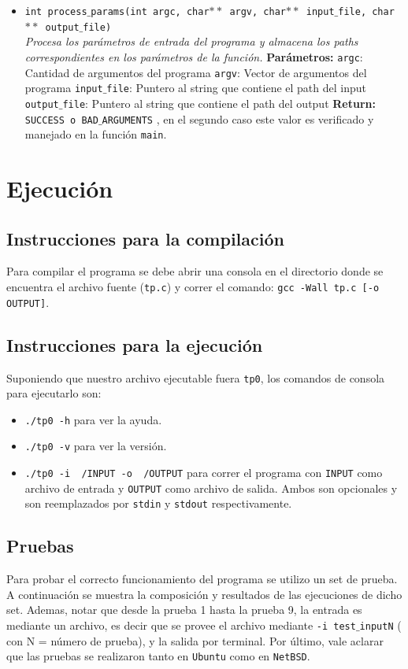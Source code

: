 \documentclass[a4paper, 10pt]{article}
\def\code#1{\texttt{#1}}
\begin{document}
\begin{itemize}
				\item \code{int process$\_$params(int argc, char$**$ argv,
				char$**$ input$\_$file, char$**$ output$\_$file)}
				\\\textit{Procesa los parámetros de entrada del programa y almacena
				los paths correspondientes en los parámetros de la función.}
					\subitem \textbf{Parámetros:}
						\subsubitem \code{argc}: Cantidad de argumentos del programa
						\subsubitem \code{argv}: Vector de argumentos del programa
						\subsubitem \code{input$\_$file}: Puntero al string que contiene el path
						del input
						\subsubitem \code{output$\_$file}: Puntero al string que contiene el path
						del output
					\subitem \textbf{Return:}
						\subsubitem \code{SUCCESS o BAD$\_$ARGUMENTS} , en el segundo caso este valor
						es verificado y manejado en la función \code{main}.


			\end{itemize}
	\section{Ejecución}
		\subsection{Instrucciones para la compilación}
			Para compilar el programa se debe abrir una consola en el directorio donde se encuentra el archivo
			fuente (\code{tp.c}) y correr el comando: \code{gcc -Wall tp.c [-o OUTPUT]}.
		\subsection{Instrucciones para la ejecución}
			Suponiendo que nuestro archivo ejecutable fuera \code{tp0}, los comandos de consola para ejecutarlo
			son:
			\begin{itemize}
				\item \code{./tp0 -h} para ver la ayuda.
				\item \code{./tp0 -v} para ver la versión.
				\item \code{./tp0 -i ~/INPUT -o ~/OUTPUT}  para correr el programa con \code{INPUT} como archivo de entrada
				y \code{OUTPUT} como archivo de salida. Ambos son opcionales y son reemplazados por \code{stdin} y \code{stdout}
				respectivamente.
			\end{itemize}
		\subsection{Pruebas}
			Para probar el correcto funcionamiento del programa se utilizo un set de prueba. A continuación
			se muestra la composición y resultados de las ejecuciones de dicho set. Ademas, notar que
      desde la prueba 1 hasta la prueba 9, la entrada es mediante un archivo, es decir que
      se provee el archivo mediante \code{-i test$\_$inputN} ( con N = número de prueba), y la salida
      por terminal. Por último, vale aclarar que las pruebas se realizaron tanto en \code{Ubuntu}
      como en \code{NetBSD}.
\end{document}
